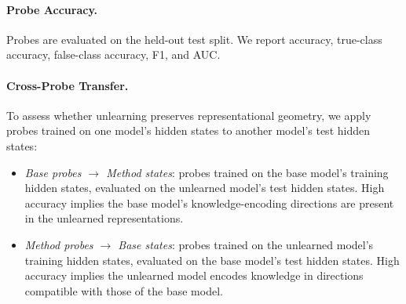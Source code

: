 \paragraph{Probe Accuracy.}
Probes are evaluated on the held-out test split.
We report accuracy, true-class accuracy, false-class accuracy, F1, and AUC.

\paragraph{Cross-Probe Transfer.}
\label{sec:cross-probe}
To assess whether unlearning preserves representational geometry, we apply probes
trained on one model's hidden states to another model's test hidden states:
\begin{itemize}[leftmargin=1.5em, itemsep=2pt]
    \item \emph{Base probes $\to$ Method states}: probes trained on the base model's
    training hidden states, evaluated on the unlearned model's test hidden states.
    High accuracy implies the base model's knowledge-encoding directions are present
    in the unlearned representations.
    \item \emph{Method probes $\to$ Base states}: probes trained on the unlearned
    model's training hidden states, evaluated on the base model's test hidden states.
    High accuracy implies the unlearned model encodes knowledge in directions
    compatible with those of the base model.
\end{itemize}
